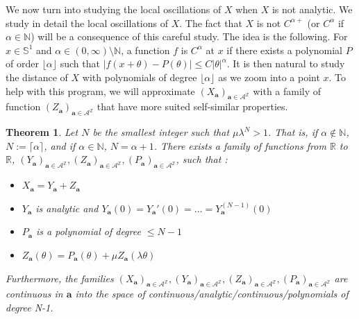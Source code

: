 \documentclass[11pt]{amsart}
\theoremstyle{plain}
\newtheorem{theorem}{Theorem}[section]
\theoremstyle{definition}
\numberwithin{equation}{section}
\begin{document}
We now turn into studying the local oscillations of $X$ when $X$ is not analytic. We study in detail the local oscillations of $X$. The fact that $X$ is not $C^{\alpha+}$ (or $C^\alpha$ if $\alpha \in \mathbb{N}$) will be a consequence of this careful study. The idea is the following. For $x \in \mathbb{S}^1$ and $\alpha \in (0,\infty) \setminus \mathbb{N}$, a function $f$ is $C^\alpha$ at $x$ if there exists a polynomial $P$ of order $\lfloor \alpha \rfloor$ such that $|f(x+\theta)-P(\theta)| \leq C |\theta|^\alpha$. It is then natural to study the distance of $X$ with polynomials of degree $\lfloor \alpha \rfloor$ as we zoom into a point $x$. To help with this program, we will approximate $(X_{\mathbf{a}})_{\mathbf{a} \in \mathcal{A}^\mathbb{Z}}$ with a family of function $(Z_{\mathbf{a}})_{\mathbf{a} \in \mathcal{A}^\mathbb{Z}}$  that have more suited self-similar properties.

\begin{theorem}
Let $N$ be the smallest integer such that $\mu \lambda^N > 1$. That is, if $\alpha \notin \mathbb{N}$, $N:= \lceil \alpha \rceil $, and if $\alpha \in \mathbb{N}$, $N = \alpha+1$.
There exists a family of functions from $\mathbb{R}$ to $\mathbb{R}$, $(Y_{\mathbf{a}})_{\mathbf{a} \in \mathcal{A}^\mathbb{Z}},(Z_{\mathbf{a}})_{\mathbf{a} \in \mathcal{A}^\mathbb{Z}},(P_{\mathbf{a}})_{\mathbf{a} \in \mathcal{A}^\mathbb{Z}}$, such that :
\begin{itemize}
\item $X_{\mathbf{a}}=Y_{\mathbf{a}}+Z_{\mathbf{a}}$
\item $Y_{\mathbf{a}}$ is analytic and $Y_{\mathbf{a}}(0)=Y_{\mathbf{a}}'(0)=\dots = Y_{\mathbf{a}}^{(N-1)}(0)$
\item $P_{\mathbf{a}}$ is a polynomial of degree $\leq N-1$
\item $Z_{\mathbf{a}}(\theta) = P_{\mathbf{a}}(\theta) + \mu Z_{\mathbf{a}}(\lambda \theta)$
\end{itemize}
Furthermore, the families $(X_{\mathbf{a}})_{\mathbf{a} \in \mathcal{A}^\mathbb{Z}},(Y_{\mathbf{a}})_{\mathbf{a} \in \mathcal{A}^\mathbb{Z}},(Z_{\mathbf{a}})_{\mathbf{a} \in \mathcal{A}^\mathbb{Z}},(P_{\mathbf{a}})_{\mathbf{a} \in \mathcal{A}^\mathbb{Z}}$ are continuous in $\mathbf{a}$ into the space of continuous/analytic/continuous/polynomials of degree N-1.
\end{theorem}
\end{document}
